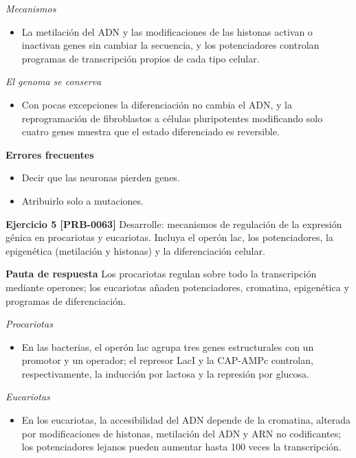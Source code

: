 \documentclass{book}
\begin{document}
\noindent\textit{Mecanismos}
\begin{itemize}
\item La metilación del ADN y las modificaciones de las histonas activan o inactivan genes sin cambiar la secuencia, y los potenciadores controlan programas de transcripción propios de cada tipo celular.
\end{itemize}

\noindent\textit{El genoma se conserva}
\begin{itemize}
\item Con pocas excepciones la diferenciación no cambia el ADN, y la reprogramación de fibroblastos a células pluripotentes modificando solo cuatro genes muestra que el estado diferenciado es reversible.
\end{itemize}

\noindent\textbf{Errores frecuentes}
\begin{itemize}
\item Decir que las neuronas pierden genes.
\item Atribuirlo solo a mutaciones.
\end{itemize}

\noindent\textbf{Ejercicio 5 [PRB-0063]}
Desarrolle: mecanismos de regulación de la expresión génica en procariotas y eucariotas. Incluya el operón lac, los potenciadores, la epigenética (metilación y histonas) y la diferenciación celular.


\noindent\textbf{Pauta de respuesta}
Los procariotas regulan sobre todo la transcripción mediante operones; los eucariotas añaden potenciadores, cromatina, epigenética y programas de diferenciación.


\noindent\textit{Procariotas}
\begin{itemize}
\item En las bacterias, el operón lac agrupa tres genes estructurales con un promotor y un operador; el represor LacI y la CAP-AMPc controlan, respectivamente, la inducción por lactosa y la represión por glucosa.
\end{itemize}

\noindent\textit{Eucariotas}
\begin{itemize}
\item En los eucariotas, la accesibilidad del ADN depende de la cromatina, alterada por modificaciones de histonas, metilación del ADN y ARN no codificantes; los potenciadores lejanos pueden aumentar hasta 100 veces la transcripción.
\end{itemize}
\end{document}
